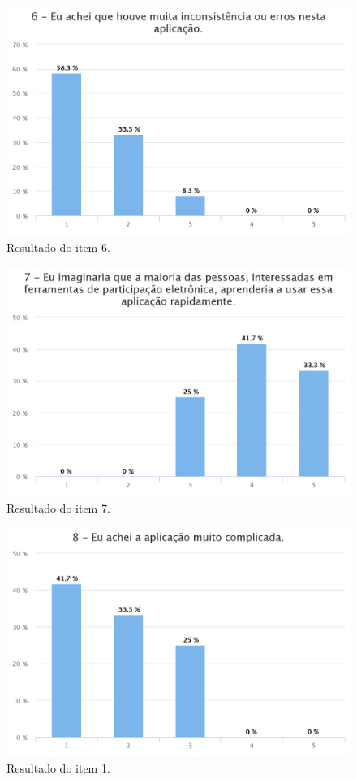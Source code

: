 \begin{figure}[!ht]
    \centering
    \includegraphics[scale=0.3]{./figuras/q6-hc.png}
    \caption{Resultado do item 6.}
    \label{fig:q6}
\end{figure}

\begin{figure}[!ht]
    \centering
    \includegraphics[scale=0.3]{./figuras/q7-hc.png}
    \caption{Resultado do item 7.}
    \label{fig:q7}
\end{figure}

\begin{figure}[!ht]
    \centering
    \includegraphics[scale=0.3]{./figuras/q8-hc.png}
    \caption{Resultado do item 1.}
    \label{fig:q8}
\end{figure}

